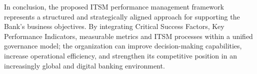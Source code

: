 In conclusion, the proposed ITSM performance management framework represents a structured and strategically aligned approach for supporting the Bank's business objectives. By integrating Critical Success Factors, Key Performance Indicators, measurable metrics and ITSM processes within a unified governance model; the organization can improve decision-making capabilities, increase operational efficiency, and strengthen its competitive position in an increasingly global and digital banking environment. \\





